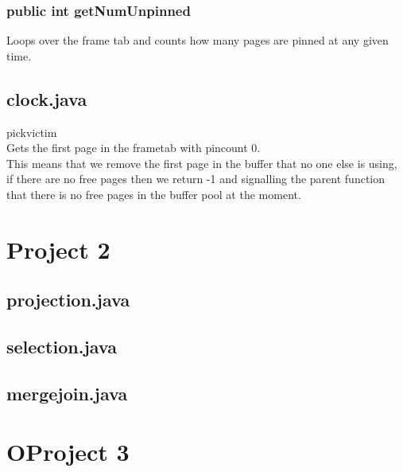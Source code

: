\documentclass[a4paper,10pt,titlepage]{report}
\begin{document}
\subsubsection{public int getNumUnpinned}

Loops over the frame tab and counts how many pages are pinned at any given time.

\vspace{5mm}
\subsection{clock.java} 
pickvictim \\
Gets the first page in the frametab with pincount 0. \\
This means that we remove the first page in the buffer that no one else is using, if there are no free pages then we return -1 and signalling the parent function that there is no free pages in the buffer pool at the moment.


\section{Project 2}

\subsection{projection.java} 

\subsection{selection.java} 

\subsection{mergejoin.java} 


\section{OProject 3}
\end{document}
